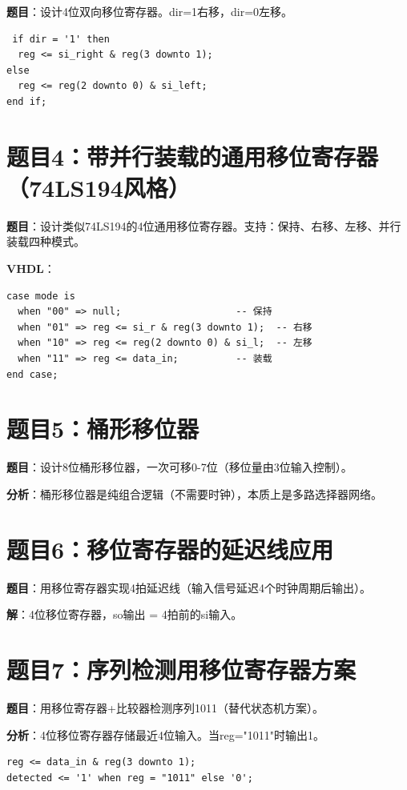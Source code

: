 \textbf{题目}：设计4位双向移位寄存器。dir=1右移，dir=0左移。

\begin{lstlisting}
 if dir = '1' then
  reg <= si_right & reg(3 downto 1);
else
  reg <= reg(2 downto 0) & si_left;
end if;
\end{lstlisting}

\section*{题目4：带并行装载的通用移位寄存器（74LS194风格）}

\textbf{题目}：设计类似74LS194的4位通用移位寄存器。支持：保持、右移、左移、并行装载四种模式。

\textbf{VHDL}：
\begin{lstlisting}
case mode is
  when "00" => null;                    -- 保持
  when "01" => reg <= si_r & reg(3 downto 1);  -- 右移
  when "10" => reg <= reg(2 downto 0) & si_l;  -- 左移
  when "11" => reg <= data_in;          -- 装载
end case;
\end{lstlisting}

\section*{题目5：桶形移位器}

\textbf{题目}：设计8位桶形移位器，一次可移0-7位（移位量由3位输入控制）。

\textbf{分析}：桶形移位器是纯组合逻辑（不需要时钟），本质上是多路选择器网络。

\section*{题目6：移位寄存器的延迟线应用}

\textbf{题目}：用移位寄存器实现4拍延迟线（输入信号延迟4个时钟周期后输出）。

\textbf{解}：4位移位寄存器，so输出 = 4拍前的si输入。

\section*{题目7：序列检测用移位寄存器方案}

\textbf{题目}：用移位寄存器+比较器检测序列1011（替代状态机方案）。

\textbf{分析}：4位移位寄存器存储最近4位输入。当reg="1011"时输出1。

\begin{lstlisting}
reg <= data_in & reg(3 downto 1);
detected <= '1' when reg = "1011" else '0';
\end{lstlisting}

